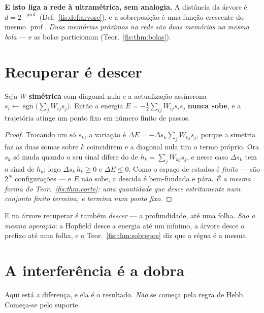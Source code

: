 \documentclass[livro.tex]{subfiles}
\begin{document}
\medskip\noindent\textbf{E isto liga a rede à ultramétrica, sem analogia.} A
distância da árvore é $d=2^{-\operatorname{prof}}$ (Def.~\ref{fis:def:arvore}), e
a sobreposição é uma função crescente do mesmo $\operatorname{prof}$. \emph{Duas
memórias próximas na rede são duas memórias na mesma bola} --- e as bolas
particionam (Teor.~\ref{fis:thm:bolas}).

\section{Recuperar é descer}\label{fis:desce}

\begin{teorema}\label{fis:thm:desce}
Seja $W$ \textbf{simétrica} com diagonal nula e a actualização assíncrona
$s_i\leftarrow\operatorname{sgn}\bigl(\sum_j W_{ij}s_j\bigr)$. Então a energia
$E=-\tfrac12\sum_{ij}W_{ij}s_is_j$ \textbf{nunca sobe}, e a trajetória atinge um
ponto fixo em número finito de passos.
\end{teorema}

\begin{proof}
Trocando um só $s_k$, a variação é
$\Delta E=-\Delta s_k\sum_{j}W_{kj}s_j$, porque a simetria faz as duas somas
sobre $k$ coincidirem e a diagonal nula tira o termo próprio. Ora $s_k$ só muda
quando o seu sinal difere do de $h_k=\sum_jW_{kj}s_j$, e nesse caso
$\Delta s_k$ tem o sinal de $h_k$; logo $\Delta s_k\,h_k\ge0$ e $\Delta E\le0$.
Como o espaço de estados é \emph{finito} --- são $2^{N}$ configurações --- e $E$
não sobe, a descida é bem-fundada e pára. \emph{É a mesma forma do
Teor.~\ref{fis:thm:corte}: uma quantidade que desce estritamente num conjunto
finito termina, e termina num ponto fixo.}
\end{proof}

\medskip\noindent E na árvore recuperar é também \emph{descer} --- a
profundidade, até uma folha. \emph{São a mesma operação}: a Hopfield desce a
energia até um mínimo, a árvore desce o prefixo até uma folha, e o
Teor.~\ref{fis:thm:sobrepoe} diz que a régua é a mesma.

\section{A interferência é a dobra}\label{fis:interfere}

\noindent Aqui está a diferença, e ela é o resultado. \emph{Não} se começa
pela regra de Hebb. Começa-se pelo suporte.
\end{document}
